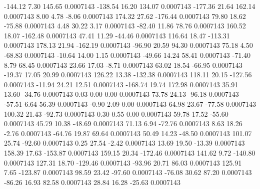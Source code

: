      -144.12        7.30      145.65     0.0007143
     -138.54       16.20      134.07     0.0007143
     -177.36       21.64      162.14     0.0007143
        8.00        4.78       -8.06     0.0007143
      174.32       27.62     -176.44     0.0007143
       79.80       18.62      -75.88     0.0007143
        4.48       30.22        3.17     0.0007143
      -82.40       11.86       78.76     0.0007143
      160.52       18.07     -162.48     0.0007143
       47.41       11.29      -44.46     0.0007143
      116.64       18.47     -113.31     0.0007143
      178.13       21.94     -162.19     0.0007143
      -96.90       20.59       94.30     0.0007143
       75.18        4.50      -68.83     0.0007143
      -10.64       14.00        1.15     0.0007143
      -49.66       14.24       58.41     0.0007143
      -71.40        8.79       68.45     0.0007143
       23.66       17.03       -8.71     0.0007143
       63.02       18.54      -66.95     0.0007143
      -19.37       17.05       20.99     0.0007143
      126.22       13.38     -132.38     0.0007143
      118.11       20.15     -127.56     0.0007143
      -11.94       24.21       12.51     0.0007143
     -168.74       19.74      172.98     0.0007143
       35.91       13.60      -34.76     0.0007143
        0.03        0.00        0.00     0.0007143
       73.78       24.13      -96.18     0.0007143
      -57.51        6.64       56.39     0.0007143
       -0.90        2.09        0.00     0.0007143
       64.98       23.67      -77.58     0.0007143
      100.32       21.43      -92.73     0.0007143
        0.30        0.55        0.00     0.0007143
       59.78       17.52      -55.60     0.0007143
       45.79       10.38      -48.69     0.0007143
       71.13        6.94      -72.76     0.0007143
        8.63       18.26       -2.76     0.0007143
      -64.76       19.87       69.64     0.0007143
       50.49       14.23      -48.50     0.0007143
      101.07       25.74      -92.60     0.0007143
        0.25       27.54       -2.42     0.0007143
       13.69       19.50      -13.39     0.0007143
      158.39       17.63     -153.87     0.0007143
      159.15       20.34     -172.46     0.0007143
      141.62        9.72     -140.80     0.0007143
      127.31       18.70     -129.46     0.0007143
      -93.96       20.71       86.03     0.0007143
      125.91        7.65     -123.87     0.0007143
       98.59       23.42      -97.60     0.0007143
      -76.08       30.62       87.20     0.0007143
      -86.26       16.93       82.58     0.0007143
       28.84       16.28      -25.63     0.0007143

